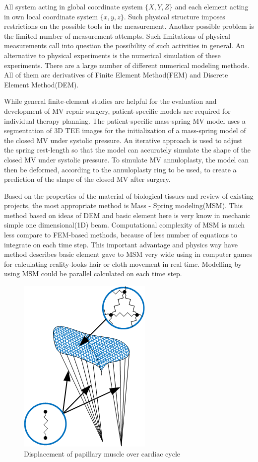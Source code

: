 All system acting in global coordinate system $\{X, Y, Z\}$ and each element acting
in own local coordinate system $\{x,y,z\}$.
Such physical structure imposes restrictions on the possible tools in the
measurement. Another possible problem is the limited number of measurement
attempts. Such limitations of physical measurements call into question the
possibility of such activities in general. An alternative to physical
experiments is the numerical simulation of these experiments. There are a large
number of different numerical modeling methods. All of them are derivatives of
Finite Element Method(FEM) and Discrete Element Method(DEM).\par
While general finite-element studies are helpful for the evaluation and
development of MV repair surgery, patient-specific models are required for
individual therapy planning.
The patient-specific mass-spring MV model uses a segmentation of 3D TEE images
for the initialization of a mass-spring model of the closed MV under systolic
pressure. An iterative approach is used to adjust the spring rest-length so that
the model can accurately simulate the shape of the closed MV under systolic
pressure. To simulate MV annuloplasty, the model can then be deformed, according
to the annuloplasty ring to be used, to create a prediction of the shape of the
closed MV after surgery.\par
Based on the properties of the material of biological tissues and review of
existing projects, the most appropriate method is Mass - Spring modeling(MSM). This
method based on ideas of DEM and basic element here is very know in mechanic
simple one dimensional(1D) beam.
Computational complexity of MSM is much less compare to FEM-based methods,
because of less number of equations to integrate on each time step. This
important advantage and physics way have method describes basic element gave to
MSM very wide using in computer games for calculating reality-looks hair or
cloth movement in real time. Modelling by using MSM could be parallel calculated
on each time step.\cite{Rasmusson2008} \cite{Amorim2012}\par
\begin{figure}[H]\label{fig:pc1}
  \centering
  \includegraphics[width=0.35\columnwidth]{./fig/pc1.png}
  \caption{Displacement of papillary muscle over cardiac cycle}
\end{figure}
